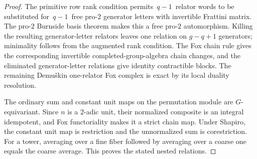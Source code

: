 \begin{proof}
The primitive
row rank
condition permits
$\,q-1\,$ relator
words to be
substituted for
$\,q-1\,$ free
pro-$2$ generator
letters with
invertible
Frattini matrix.
The pro-$2$
Burnside basis
theorem makes
this a free
pro-$2$
automorphism.
Killing the
resulting
generator-letter
relators leaves
one relation
on $g-q+1$
generators;
minimality
follows from
the augmented
rank condition.
The Fox chain
rule gives
the corresponding
invertible
completed-group-algebra
chain changes,
and the eliminated
generator-letter
relations give
identity
contractible
blocks.
The remaining
Demu\v{s}kin
one-relator Fox
complex is exact
by its local
duality resolution.

The ordinary
sum and constant
unit maps on
the permutation
module are
$G$-equivariant.
Since $n$ is
a $2$-adic unit,
their normalized
composite is
an integral
idempotent,
and Fox
functoriality
makes it a
strict chain map.
Under Shapiro,
the constant
unit map is
restriction and
the unnormalized
sum is
corestriction.
For a tower,
averaging over
a fine fiber
followed by
averaging over
a coarse one
equals the
coarse average.
This proves
the stated
nested relations.
\end{proof}

